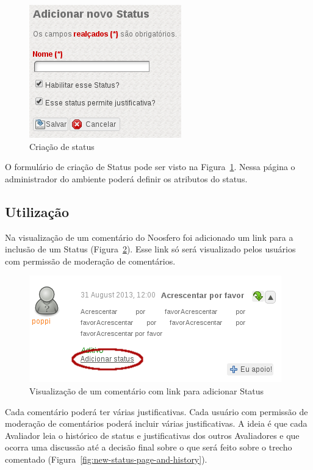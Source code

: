 \documentclass[11pt]{article}
\begin{document}
\begin{figure}[h]
\center
\includegraphics[scale=0.5]{new-status-page.png}
\caption{Criação de status}
\label{fig:new-status-page}
\end{figure}

O formulário de criação de Status pode ser visto na
Figura~\ref{fig:new-status-page}. Nessa página o administrador
do ambiente poderá definir os atributos do status.

\subsection{Utilização}

Na visualização de um comentário do Noosfero foi adicionado um link para
a inclusão de um Status (Figura~\ref{fig:comment-view-status}). Esse
link só será visualizado pelos usuários com permissão de moderação de
comentários.

\begin{figure}[h]
\center
\includegraphics[scale=0.6]{comment-view-status.png}
\caption{Visualização de um comentário com link para adicionar Status}
\label{fig:comment-view-status}
\end{figure}

Cada comentário poderá ter várias justificativas. Cada usuário com
permissão de moderação de comentários poderá incluir várias
justificativas. A ideia é que cada Avaliador leia o histórico de
status e justificativas dos outros Avaliadores e que ocorra uma
discussão até a decisão final sobre o que será feito sobre o trecho
comentado (Figura~\ref{fig:new-status-page-and-history}).
\end{document}
